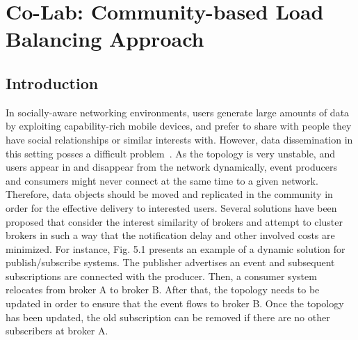 \chapter{Co-Lab: Community-based Load Balancing Approach}\label{Chap5}

\section{Introduction}\label{Chap5_01}
In socially-aware networking environments, users generate large amounts of data by exploiting capability-rich mobile devices, and prefer to share with people they have social relationships or similar interests with. However, data dissemination in this setting posses a difficult problem~\cite{YZhu2013}. As the topology is very unstable, and users appear in and disappear from the network dynamically, event producers and consumers might never connect at the same time to a given network. Therefore, data objects should be moved and replicated in the community in order for the effective delivery to interested users.  Several solutions have been proposed that consider the interest similarity of brokers and attempt to cluster brokers in such a way that the notification delay and other involved costs are minimized. For instance,  Fig. 5.1 presents an example of a dynamic solution for publish/subscribe systems. The publisher advertises an event and subsequent subscriptions are connected with the producer. Then, a consumer system relocates from broker A to broker B. After that, the topology needs to be updated in order to ensure that the event flows to broker B. Once the topology has been updated, the old subscription can be removed if there are no other subscribers at broker A.

